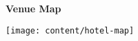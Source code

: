 \thispagestyle{empty}

\begin{center}
  {\huge\bf Venue Map}\label{maps}

  \texttt{[image: content/hotel-map]}
\end{center}

%
%
%
